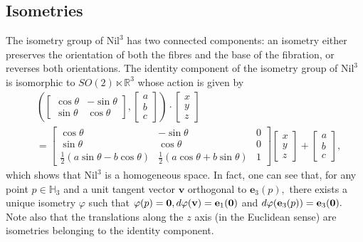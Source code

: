 \documentclass[11pt]{amsart}
\begin{document}
\subsection{Isometries} The isometry group of $\text{Nil}^3$ has two connected components:
an isometry either preserves the orientation of both the fibres
and the base of the fibration, or reverses both orientations. The
identity component of the isometry group of $\text{Nil}^3$ is
isomorphic to $SO(2)\ltimes{\mathbb{R}}^3$ whose action is given by
\[
\begin{split}
& \left( \left[ \begin{array}{cc}\cos\theta&-\sin\theta\\
\sin\theta&\cos\theta \end{array}\right], \left[
\begin{array}{c}a\\b\\c\end{array}\right]\right)\cdot\left[\begin{array}{c}x\\y\\z\end{array}\right]\\
&=\left[\begin{array}{ccc}\cos\theta&-\sin\theta&0\\\sin\theta&\cos\theta&0\\
\frac12(a\sin\theta-b\cos\theta)&\frac12(a\cos\theta+b\sin\theta)&1\end{array}\right]
\left[
\begin{array}{c}x\\y\\z\end{array}\right]+\left[\begin{array}{c}a\\b\\c\end{array}\right],
\end{split}
\]
which shows that $\text{Nil}^3$ is a homogeneous space. In fact,
one can see that, for any point $p\in {\mathbb{H}}_3$ and a unit tangent
vector ${\mathbf{v}}$ orthogonal to ${\mathbf{e}}_3(p),$ there exists a unique
isometry $\varphi$ such that $\varphi(p)={\bf 0},
d\varphi({\mathbf{v}})={\mathbf{e}}_1({\bf 0})$ and
$d\varphi({\mathbf{e}}_3(p))={\mathbf{e}}_3({\bf 0}).$ Note also that the
translations along the $z$ axis (in the Euclidean sense) are
isometries belonging to the identity component.
\end{document}

